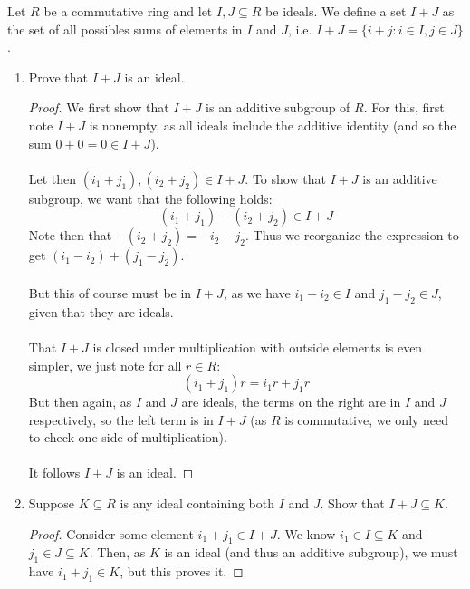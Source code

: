 \documentclass[12pt]{article}
\newenvironment{ex}[2][Exercise]{\begin{trivlist}
\item[\hskip \labelsep {\bfseries #1}\hskip \labelsep {\bfseries #2.}]}{\end{trivlist}}
\begin{document}
\begin{ex}{3}
    Let $R$ be a commutative ring and let $I, J \subseteq R$ be ideals. We define a set $I + J$ as the set of all possibles sums of elements in $I$ and $J$, i.e. $I + J = \{i + j : i \in I, j \in J\}$.
    \begin{enumerate}[label=(\alph*)]
        \item Prove that $I + J$ is an ideal.
        \begin{proof}
            We first show that $I + J$ is an additive subgroup of $R$. For this, first note $I + J$ is nonempty, as all ideals include the additive identity (and so the sum $0 + 0 = 0 \in I + J$). \\ \\
            Let then $(i_1 + j_1), (i_2 + j_2) \in I + J$. To show that $I + J$ is an additive subgroup, we want that the following holds:
            \begin{equation}
                (i_1 + j_1) - (i_2 + j_2) \in I + J
            \end{equation}
            Note then that $-(i_2 + j_2) = -i_2 -j_2$. Thus we reorganize the expression to get $(i_1 - i_2) + (j_1 - j_2)$. \\ \\
            But this of course must be in $I + J$, as we have $i_1 - i_2 \in I$ and $j_1 - j_2 \in J$, given that they are ideals. \\ \\
            That $I + J$ is closed under multiplication with outside elements is even simpler, we just note for all $r \in R$:
            \begin{equation}
                (i_1 + j_1)r = i_1r + j_1r
            \end{equation}
            But then again, as $I$ and $J$ are ideals, the terms on the right are in $I$ and $J$ respectively, so the left term is in $I + J$ (as $R$ is commutative, we only need to check one side of multiplication). \\ \\
            It follows $I + J$ is an ideal.
        \end{proof}
        \item Suppose $K \subseteq R$ is any ideal containing both $I$ and $J$. Show that $I + J \subseteq K$.
        \begin{proof}
            Consider some element $i_1 + j_1 \in I + J$. We know $i_1 \in I \subseteq K$ and $j_1 \in J \subseteq K$. Then, as $K$ is an ideal (and thus an additive subgroup), we must have $i_1 + j_1 \in K$, but this proves it.

\end{proof}
\end{enumerate}
\end{ex}
\end{document}

